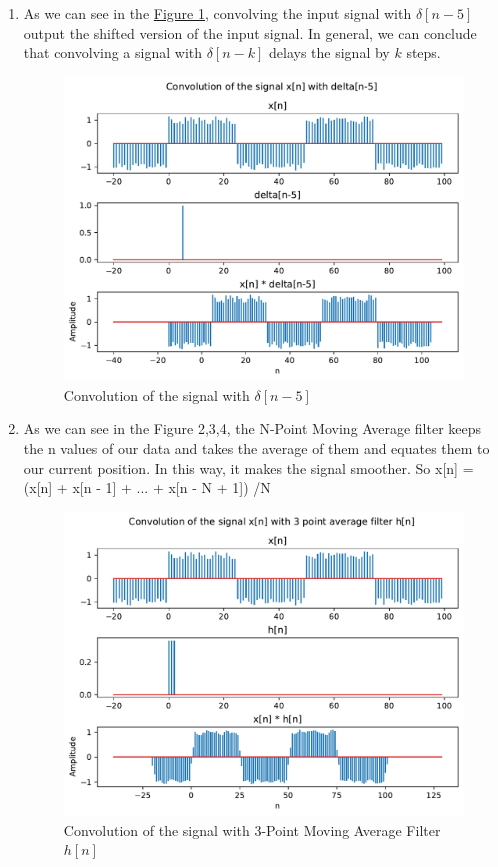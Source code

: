 \documentclass[10pt,a4paper, margin=1in]{article}
\begin{document}
\begin{enumerate}
\begin{enumerate}
    \item %
    As we can see in the \hyperref[fig:figure2]{Figure 1}, convolving the input signal with $\delta[n-5]$ output the shifted version of the input signal. In general, we can conclude that convolving a signal with $\delta[n-k]$ delays the signal by $k$ steps.
    \begin{figure}[!htb]
    \centering
    \includegraphics[width=1\textwidth]{q7/7a_convolution.pdf}
    \caption{Convolution of the signal with $\delta[n-5]$}
    \label{fig:figure2}
    \end{figure}

    
    \item %
    As we can see in the Figure 2,3,4, the N-Point Moving Average filter keeps the n values of our data and takes the average of them and equates them to our current position. In this way, it makes the signal smoother. So x[n] = (x[n] + x[n - 1] + ... + x[n - N + 1]) /N
    \begin{figure}[!htb]
    \centering
    \includegraphics[width=1\textwidth]{q7/7b_convolution3.pdf}
    \caption{Convolution of the signal with 3-Point Moving Average Filter $h[n]$}
    \label{fig:figure2}
    \end{figure}
    

\end{enumerate}
\end{enumerate}
\end{document}
